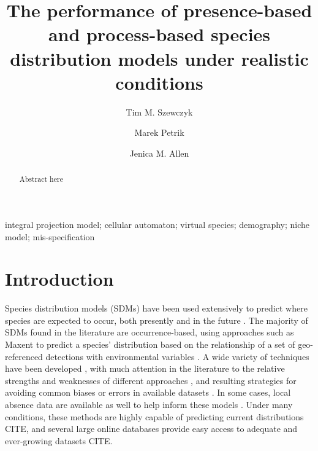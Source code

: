 \documentclass[preprint,review,times,12pt]{elsarticle}
\begin{document}
\begin{frontmatter}

\title{The performance of presence-based and process-based species distribution models under realistic conditions}

\author[NREN,CS]{Tim M. Szewczyk}
\author[CS]{Marek Petrik}
\author[NREN]{Jenica M. Allen}

\address[NREN]{Department of Natural Resources and the Environment, University of New Hampshire}
\address[CS]{Department of Computer Science, University of New Hampshire}

\begin{abstract}
Abstract here
\end{abstract}

\begin{keyword}
integral projection model; cellular automaton; virtual species; demography; niche model; mis-specification
\end{keyword}

\end{frontmatter}
\linenumbers



\section{Introduction}
\label{S:1}
Species distribution models (SDMs) have been used extensively to predict where species are expected to occur, both presently and in the future \citep{Guisan2005,Phillips2008,Elith2009,Allen2016,Araujo2019}. The majority of SDMs found in the literature are occurrence-based, using approaches such as Maxent to predict a species' distribution based on the relationship of a set of geo-referenced detections with environmental variables \citep{Elith2009}. A wide variety of techniques have been developed \citep{Elith2009,Fitzpatrick2013,Norberg2019}, with much attention in the literature to the relative strengths and weaknesses of different approaches \citep{Elith2009,Merow2014b,Fernandes2018,Norberg2019}, and resulting strategies for avoiding common biases or errors in available datasets \citep{Merow2013,Boria2014,Merow2016}. In some cases, local absence data are available as well to help inform these models \citep{Koshkina2017}. Under many conditions, these methods are highly capable of predicting current distributions CITE, and several large online databases provide easy access to adequate and ever-growing datasets CITE.
\end{document}
